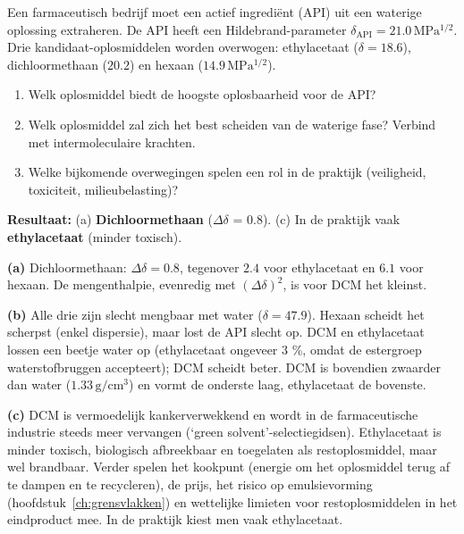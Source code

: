 \begin{oefening}
Een farmaceutisch bedrijf moet een actief ingrediënt (API) uit een waterige oplossing extraheren. De API heeft een Hildebrand-parameter \(\delta_{\text{API}} = 21.0\,\mathrm{MPa^{1/2}}\). Drie kandidaat-oplosmiddelen worden overwogen: ethylacetaat (\(\delta = 18.6\)), dichloormethaan (\(20.2\)) en hexaan (\(14.9\,\mathrm{MPa^{1/2}}\)).

\begin{enumerate}
\item[(a)]
  Welk oplosmiddel biedt de hoogste oplosbaarheid voor de API?
\item[(b)]
  Welk oplosmiddel zal zich het best scheiden van de waterige fase? Verbind met intermoleculaire krachten.
\item[(c)]
  Welke bijkomende overwegingen spelen een rol in de praktijk (veiligheid, toxiciteit, milieubelasting)?
\end{enumerate}
\end{oefening}
\begin{oplossing}
\textbf{Resultaat:} (a) \textbf{Dichloormethaan} (\(\Delta\delta\) = 0.8). (c) In de praktijk vaak \textbf{ethylacetaat} (minder toxisch).

\textbf{(a)} Dichloormethaan: \(\Delta\delta = 0.8\), tegenover \(2.4\) voor ethylacetaat en \(6.1\) voor hexaan. De mengenthalpie, evenredig met \((\Delta\delta)^2\), is voor DCM het kleinst.

\textbf{(b)} Alle drie zijn slecht mengbaar met water (\(\delta = 47.9\)). Hexaan scheidt het scherpst (enkel dispersie), maar lost de API slecht op. DCM en ethylacetaat lossen een beetje water op (ethylacetaat ongeveer 3 \%, omdat de estergroep waterstofbruggen accepteert); DCM scheidt beter. DCM is bovendien zwaarder dan water (\(1.33\,\mathrm{g/cm^3}\)) en vormt de onderste laag, ethylacetaat de bovenste.

\textbf{(c)} DCM is vermoedelijk kankerverwekkend en wordt in de farmaceutische industrie steeds meer vervangen (`green solvent'-selectiegidsen). Ethylacetaat is minder toxisch, biologisch afbreekbaar en toegelaten als restoplosmiddel, maar wel brandbaar. Verder spelen het kookpunt (energie om het oplosmiddel terug af te dampen en te recycleren), de prijs, het risico op emulsievorming (hoofdstuk~\ref{ch:grensvlakken}) en wettelijke limieten voor restoplosmiddelen in het eindproduct mee. In de praktijk kiest men vaak ethylacetaat.
\end{oplossing}

